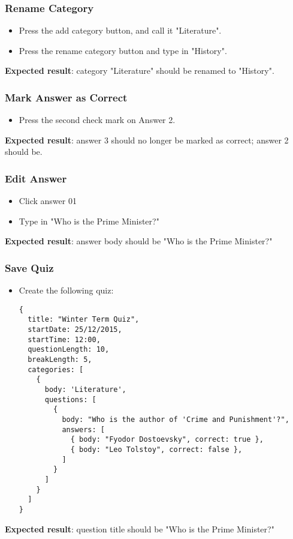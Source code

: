 \subsubsection{Rename Category}
\begin{itemize}
\item Press the add category button, and call it "Literature".
\item Press the rename category button and type in "History".
\end{itemize}
\textbf{Expected result}: category "Literature" should be renamed to "History".

\subsubsection{Mark Answer as Correct}
\begin{itemize}
\item Press the second check mark on Answer 2.
\end{itemize}
\textbf{Expected result}: answer 3 should no longer be marked as correct; answer 2 should be.

\subsubsection{Edit Answer}
\begin{itemize}
\item Click answer 01
\item Type in "Who is the Prime Minister?"
\end{itemize}
\textbf{Expected result}: answer body should be "Who is the Prime Minister?"

\subsubsection{Save Quiz}
\begin{itemize}
\item Create the following quiz:
\begin{verbatim}
{
  title: "Winter Term Quiz",
  startDate: 25/12/2015,
  startTime: 12:00,
  questionLength: 10,
  breakLength: 5,
  categories: [
    {
      body: 'Literature',
      questions: [
        {
          body: "Who is the author of 'Crime and Punishment'?",
          answers: [
            { body: "Fyodor Dostoevsky", correct: true },
            { body: "Leo Tolstoy", correct: false },
          ]
        }
      ]
    }
  ]
}
\end{verbatim}
\end{itemize}
\textbf{Expected result}: question title should be "Who is the Prime Minister?"
